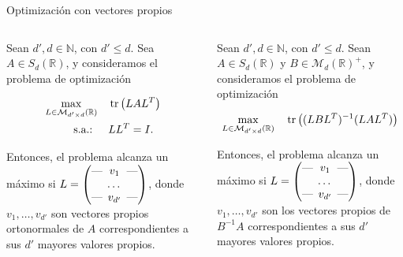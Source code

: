 \documentclass[10pt, compress]{beamer}
\newcommand\R{\mathbb{R}}
\newcommand\N{\mathbb{N}}
\begin{document}
\begin{frame}[shrink]{Optimización con vectores propios}
  \begin{columns}
    \begin{theorem}\label{thm:eigen_trace_opt}
      Sean $d',d \in \N $, con $d' \le d$. Sea $A \in S_d(\R)$, y consideramos el problema de optimización
      
      \begin{equation*}
      \begin{split}
          \max_{L \in \mathcal{M}_{d'\times d}(\R)} &\quad \tr\left(LAL^T\right)  \\
          \text{s.a.: } &\quad LL^T = I.
      \end{split}
      \end{equation*}
      
      Entonces, el problema alcanza un máximo si $L = \begin{pmatrix}
      \text{---} \hspace{-0.2cm} & v_1 & \hspace{-0.2cm} \text{---} \\
      & \dots &  \\
      \text{---} \hspace{-0.2cm} & v_{d'} & \hspace{-0.2cm} \text{---}
      \end{pmatrix}$, donde $v_1,\dots,v_{d'}$ son vectores propios ortonormales de $A$ correspondientes a sus $d'$ mayores valores propios.
      
    \end{theorem}


    \begin{theorem} \label{thm:eigen_trace_ratio_opt}
      Sean $d',d \in \N $, con $d' \le d$. Sean $A \in S_d(\R)$ y $B \in \mathcal{M}_d(\R)^+$, y consideramos el problema de optimización
    

      \begin{equation*} \label{eq:eigen_trace_ratio_opt}
      \max_{L \in \mathcal{M}_{d'\times d}(\R)} \quad \tr\left((LBL^T)^{-1}(LAL^T)\right)
      \end{equation*}

      Entonces, el problema alcanza un máximo si $L = \begin{pmatrix}
      \text{---} \hspace{-0.2cm} & v_1 & \hspace{-0.2cm} \text{---} \\
      & \dots &  \\
      \text{---} \hspace{-0.2cm} & v_{d'} & \hspace{-0.2cm} \text{---}
      \end{pmatrix}$, donde $v_1,\dots,v_{d'}$ son los vectores propios de $B^{-1}A$ correspondientes a sus $d'$ mayores valores propios.
    \end{theorem}
  \end{columns}
\end{frame}
\end{document}
